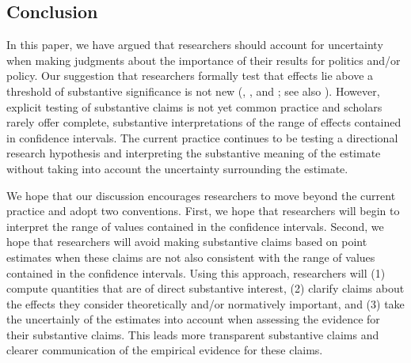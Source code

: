\documentclass[12pt]{article}
\begin{document}
\subsection*{Conclusion}

In this paper, we have argued that researchers should account for uncertainty when making judgments about the importance of their results for politics and/or policy. Our suggestion that researchers formally test that effects lie above a threshold of substantive significance is not new (\citealt{Achen1982}, \citealt{Rainey2014a}, and \citealt{Gross2014}; see also \citealt{EsareyDanneman2014}). However, explicit testing of substantive claims is not yet common practice and scholars rarely offer complete, substantive interpretations of the range of effects contained in confidence intervals. The current practice continues to be testing a directional research hypothesis and interpreting the substantive meaning of the estimate without taking into account the uncertainty surrounding the estimate. 

We hope that our discussion encourages researchers to move beyond the current practice and adopt two conventions. First, we hope that researchers will begin to interpret the range of values contained in the confidence intervals. Second, we hope that researchers will avoid making substantive claims based on point estimates when these claims are not also consistent with the range of values contained in the confidence intervals. Using this approach, researchers will (1) compute quantities that are of direct substantive interest, (2) clarify claims about the effects they consider theoretically and/or normatively important, and (3) take the uncertainly of the estimates into account when assessing the evidence for their substantive claims. This leads more transparent substantive claims and clearer communication of the empirical evidence for these claims.


\singlespace

%
% 

\end{document}
